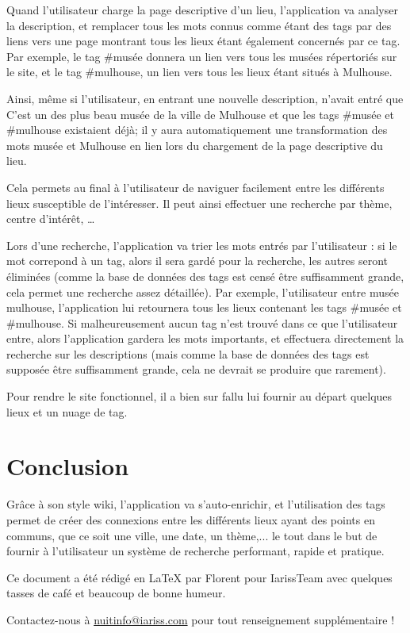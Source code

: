 \documentclass[12pt, a4paper]{article}
\newcommand{\espace}{\vspace{.8cm}}
\newcommand{\authors}{Florent}
\begin{document}
Quand l'utilisateur charge la page descriptive d'un lieu, l'application va analyser la description, et remplacer tous les mots connus comme étant des tags par des liens vers une page montrant tous les lieux étant également concernés par ce tag. Par exemple, le tag \#musée donnera un lien vers tous les musées répertoriés sur le site, et le tag \#mulhouse, un lien vers tous les lieux étant situés à Mulhouse.

Ainsi, même si l'utilisateur, en entrant une nouvelle description, n'avait entré que \og{}C'est un des plus beau musée de la ville de Mulhouse\fg{} et que les tags \#musée et \#mulhouse existaient déjà; il y aura automatiquement une transformation des mots \og{}musée\fg{} et \og{}Mulhouse\fg{} en lien lors du chargement de la page descriptive du lieu.

Cela permets au final à l'utilisateur de naviguer facilement entre les différents lieux susceptible de l'intéresser. Il peut ainsi effectuer une recherche par thème, centre d'intérêt, \ldots{}

\espace{}
Lors d'une recherche, l'application va trier les mots entrés par l'utilisateur :  si le mot correpond à un tag, alors il sera gardé pour la recherche, les autres seront éliminées (comme la base de données des tags est censé être suffisamment grande, cela permet une recherche assez détaillée). Par exemple, l'utilisateur entre \og{}musée mulhouse\fg{}, l'application lui retournera tous les lieux contenant les tags \#musée et \#mulhouse. Si malheureusement aucun tag n'est trouvé dans ce que l'utilisateur entre, alors l'application gardera les mots importants, et effectuera directement la recherche sur les descriptions (mais comme la base de données des tags est supposée être suffisamment grande, cela ne devrait se produire que rarement).

\espace{}
Pour rendre le site fonctionnel, il a bien sur fallu lui fournir au départ quelques lieux et un nuage de tag.

\espace{}
\section{Conclusion}
Grâce à son style wiki, l'application va s'auto-enrichir, et l'utilisation des tags permet de créer des connexions entre les différents lieux ayant des points en communs, que ce soit une ville, une date, un thème,... le tout dans le but de fournir à l'utilisateur un système de recherche performant, rapide et pratique.


\espace\vfill{}
Ce document a été rédigé en \LaTeX{} par \authors{} pour IarissTeam avec quelques tasses de café et beaucoup de bonne humeur.

Contactez-nous à \href{mailto:nuitinfo@iariss.com}{nuitinfo@iariss.com} pour tout renseignement supplémentaire !
\end{document}
